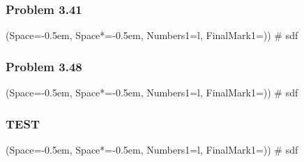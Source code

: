 \documentclass[12pt, a4paper]{article}
\newcommand{\listSpace}{-0.5em}%
\begin{document}
\subsubsection*{Problem 3.41}
\begin{easylist}[enumerate]
	\ListProperties(Space=\listSpace, Space*=\listSpace, Numbers1=l, FinalMark1={)})
	# sdf
\end{easylist}

\subsubsection*{Problem 3.48}
\begin{easylist}[enumerate]
	\ListProperties(Space=\listSpace, Space*=\listSpace, Numbers1=l, FinalMark1={)})
	# sdf
\end{easylist}




\subsubsection*{TEST}
\begin{easylist}[enumerate]
\ListProperties(Space=\listSpace, Space*=\listSpace, Numbers1=l, FinalMark1={)})
# sdf
\end{easylist}
\end{document}
